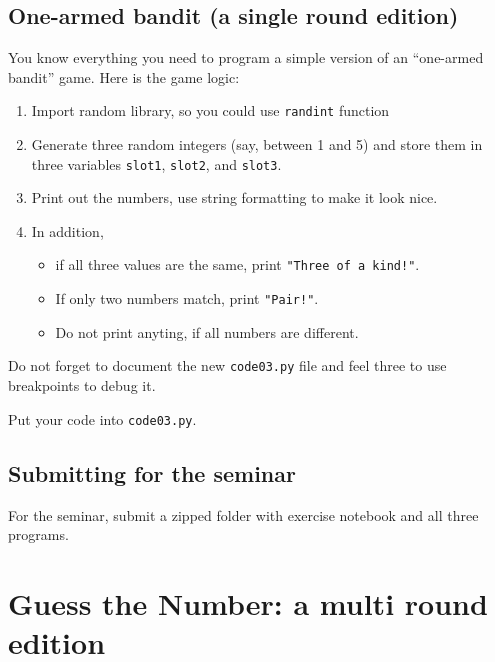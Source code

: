 \documentclass[
]{book}
\providecommand{\tightlist}{%
  \setlength{\itemsep}{0pt}\setlength{\parskip}{0pt}}
\begin{document}
\hypertarget{one-armed-bandit-a-single-round-edition}{%
\section{One-armed bandit (a single round edition)}\label{one-armed-bandit-a-single-round-edition}}

You know everything you need to program a simple version of an ``one-armed bandit'' game. Here is the game logic:

\begin{enumerate}
\def\labelenumi{\arabic{enumi}.}
\tightlist
\item
  Import random library, so you could use \texttt{randint} function
\item
  Generate three random integers (say, between 1 and 5) and store them in three variables \texttt{slot1}, \texttt{slot2}, and \texttt{slot3}.
\item
  Print out the numbers, use string formatting to make it look nice.
\item
  In addition,

  \begin{itemize}
  \tightlist
  \item
    if all three values are the same, print \texttt{"Three\ of\ a\ kind!"}.
  \item
    If only two numbers match, print \texttt{"Pair!"}.
  \item
    Do not print anyting, if all numbers are different.
  \end{itemize}
\end{enumerate}

Do not forget to document the new \texttt{code03.py} file and feel three to use breakpoints to debug it.

Put your code into \texttt{code03.py}.

\hypertarget{submitting-for-the-seminar}{%
\section{Submitting for the seminar}\label{submitting-for-the-seminar}}

For the seminar, submit a zipped folder with exercise notebook and all three programs.

\hypertarget{guess-the-number-multi-round}{%
\chapter{Guess the Number: a multi round edition}\label{guess-the-number-multi-round}}
\end{document}
